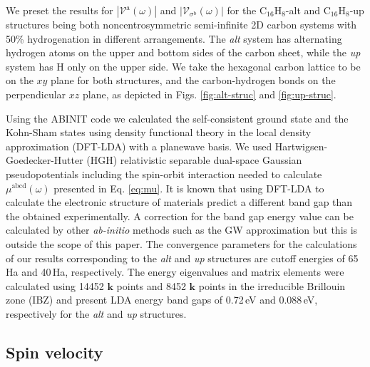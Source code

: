 \documentclass[prb,11pt,tightenlines,twocolumn,aps]{revtex4-1}
\begin{document}
We preset the results for $|\mathcal{V}^{\mathrm{a}}(\omega)|$ and
$|\mathcal{V}_{\sigma^{\mathrm{b}}}(\omega)|$ for the C$_{16}$H$_{8}$-alt and
C$_{16}$H$_{8}$-up structures being both noncentrosymmetric semi-infinite 2D
carbon systems with 50\% hydrogenation in different arrangements. The \emph{alt}
system has alternating hydrogen atoms on the upper and bottom sides of the
carbon sheet, while the \emph{up} system has H only on the upper side. We take
the hexagonal carbon lattice to be on the $xy$ plane for both structures, and
the carbon-hydrogen bonds on the perpendicular $xz$ plane, as depicted in Figs.
\ref{fig:alt-struc} and \ref{fig:up-struc}.

Using the ABINIT code \cite{gonzeCPC09} we calculated the self-consistent ground
state and the Kohn-Sham states using density functional theory in the local
density approximation (DFT-LDA) with a planewave basis. We used Hartwigsen-
Goedecker-Hutter (HGH) relativistic separable dual-space Gaussian
pseudopotentials \cite{hartwigsenPRB98} including the spin-orbit interaction
needed to calculate $\mu^{\mathrm{abcd}}(\omega)$ presented in Eq.
\eqref{eq:mu}.
% 
It is known that using DFT-LDA to calculate the electronic structure of
materials predict a different band gap than the obtained experimentally. A
correction for the band gap energy value can be calculated by other 
\emph{ab-initio} methods such as the GW approximation \cite{onidaRMP02} but this
is outside the scope of this paper.
% 
The convergence parameters for the calculations of our results corresponding to
the \emph{alt} and \emph{up} structures are cutoff energies of 65\,Ha and
40\,Ha, respectively. The energy eigenvalues and matrix elements were calculated
using 14452 $\mathbf{k}$ points and 8452 $\mathbf{k}$ points in the irreducible
Brillouin zone (IBZ) and present LDA energy band gaps of 0.72\,eV and 0.088\,eV,
respectively for the \emph{alt} and \emph{up} structures. 



\subsection{Spin velocity} %
\label{sec:res-spin_velocity}
\end{document}
